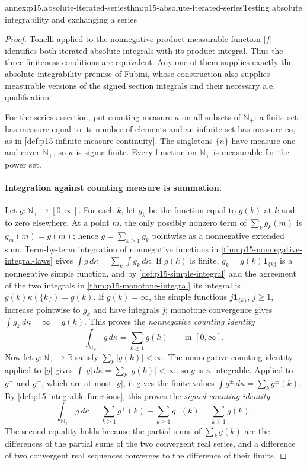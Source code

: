 \begin{annexitem}{annex:p15.absolute-iterated-series}{thm:p15-absolute-iterated-series}{Testing absolute integrability and exchanging a series}
\begin{proof}
Tonelli applied to the nonnegative product measurable function \(|f|\)
identifies both iterated absolute integrals with its product integral.
Thus the three finiteness conditions are equivalent. Any one of them
supplies exactly the absolute-integrability premise of Fubini, whose
construction also supplies measurable versions of the signed section
integrals and their necessary a.e. qualification.

For the series assertion, put counting measure \(\kappa\) on all
subsets of \(\mathbb N_+\): a finite set has measure equal to its
number of elements and an infinite set has measure \(\infty\), as in
\cref{def:p15-infinite-measure-continuity}. The singletons \(\{n\}\)
have measure one and cover \(\mathbb N_+\), so \(\kappa\) is
sigma-finite. Every function on \(\mathbb N_+\) is measurable for the
power set.

\paragraph{Integration against counting measure is summation.}
Let \(g:\mathbb N_+\to[0,\infty]\). For each \(k\), let \(g_k\) be
the function equal to \(g(k)\) at \(k\) and to zero elsewhere. At a
point \(m\), the only possibly nonzero term of \(\sum_k g_k(m)\) is
\(g_m(m)=g(m)\); hence \(g=\sum_{k\geq1}g_k\) pointwise as a
nonnegative extended sum. Term-by-term integration of nonnegative
functions in \cref{thm:p15-nonnegative-integral-laws} gives
\(\int g\,d\kappa=\sum_k\int g_k\,d\kappa\). If \(g(k)\) is finite,
\(g_k=g(k)\mathbf1_{\{k\}}\) is a nonnegative simple function, and by
\cref{def:p15-simple-integral} and the agreement of the two integrals in
\cref{thm:p15-monotone-integral} its integral is
\(g(k)\kappa(\{k\})=g(k)\). If \(g(k)=\infty\), the simple functions
\(j\mathbf1_{\{k\}}\), \(j\geq1\), increase pointwise to \(g_k\) and
have integrals \(j\); monotone convergence gives
\(\int g_k\,d\kappa=\infty=g(k)\). This proves the \emph{nonnegative
counting identity}
\[
 \int_{\mathbb N_+}g\,d\kappa=\sum_{k\geq1}g(k)
 \qquad\text{in }[0,\infty].
\]
Now let \(g:\mathbb N_+\to\mathbb R\) satisfy
\(\sum_k|g(k)|<\infty\). The nonnegative counting identity applied to
\(|g|\) gives \(\int|g|\,d\kappa=\sum_k|g(k)|<\infty\), so \(g\) is
\(\kappa\)-integrable. Applied to \(g^+\) and \(g^-\), which are at
most \(|g|\), it gives the finite values
\(\int g^\pm\,d\kappa=\sum_k g^\pm(k)\). By
\cref{def:p15-integrable-functions}, this proves the \emph{signed
counting identity}
\[
 \int_{\mathbb N_+}g\,d\kappa
   =\sum_{k\geq1}g^+(k)-\sum_{k\geq1}g^-(k)
   =\sum_{k\geq1}g(k).
\]
The second equality holds because the partial sums of
\(\sum_kg(k)\) are the differences of the partial sums of the two
convergent real series, and a difference of two convergent real
sequences converges to the difference of their limits.


\end{proof}
\end{annexitem}
